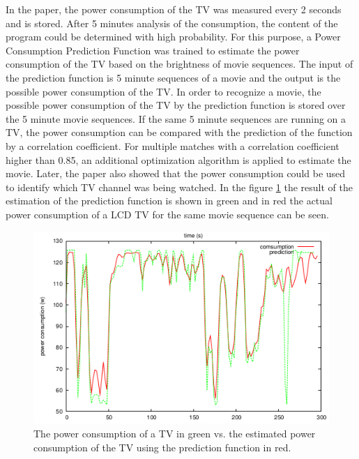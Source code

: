 In the paper, the power consumption of the TV was measured every 2 seconds and is stored. After 5 minutes analysis of the consumption, the content of the program could be determined with high probability. For this purpose, a Power Consumption Prediction Function was trained to estimate the power consumption of the TV based on the brightness of movie sequences. 
The input of the prediction function is 5 minute sequences of a movie and the output is the possible power consumption of the TV. 
In order to recognize a movie, the possible power consumption of the TV by the prediction function is stored over the 5 minute movie sequences. If the same 5 minute sequences are running on a TV, the power consumption can be compared with the prediction of the function by a correlation coefficient. For multiple matches with a correlation coefficient higher than 0.85, an additional optimization algorithm is applied to estimate the movie. Later, the paper also showed that the power consumption could be used to identify which TV channel was being watched. In the figure \ref{fig:tv} the result of the estimation of the prediction function is shown in green and in red the actual power consumption of a LCD TV for the same movie sequence can be seen. 
\begin{figure}[tbp]
  \centering
  \includegraphics[width=1\textwidth]{images/Fernseher.png}
  \caption[Estimated power consumption of a TV]{The power consumption of a TV in green vs. the estimated power consumption of the TV using the prediction function in red.}
  \label{fig:tv}
\end{figure}
